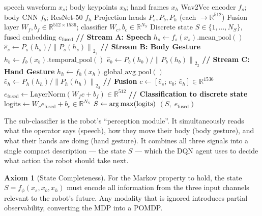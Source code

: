 \documentclass[12pt,a4paper]{article}
\theoremstyle{definition}
\newtheorem{axiom}{Axiom}[section]
\theoremstyle{plain}
\theoremstyle{remark}
\newcommand{\R}{\mathbb{R}}
\newcommand{\Norm}[1]{\left\|#1\right\|_2}
\newcommand{\LN}{\mathrm{LayerNorm}}
\newcommand{\argmax}{\operatornamewithlimits{arg\,max}}
\begin{document}
\begin{algorithm}[H]
\caption{Sub-Classifier Forward Pass: Multimodal State Encoding}
\label{alg:subclassifier}
\begin{algorithmic}[1]
\Require speech waveform $x_s$; body keypoints $x_b$; hand frames $x_h$
\Require Wav2Vec encoder $f_s$; body CNN $f_b$; ResNet-50 $f_h$
\Require Projection heads $P_s, P_b, P_h$ (each $\to \R^{512}$)
\Require Fusion layer $W_f, b_f \in \R^{512 \times 1536}$; classifier $W_c, b_c \in \R^{N_S}$
\Ensure Discrete state $S \in \{1,\ldots,N_S\}$, fused embedding $e_{\text{fused}}$
\State \textbf{// Stream A: Speech}
\State $h_s \gets f_s(x_s).\text{mean\_pool}()$ 
\State $\hat{e}_s \gets P_s(h_s) / \Norm{P_s(h_s)}_2$ 
\State \textbf{// Stream B: Body Gesture}
\State $h_b \gets f_b(x_b).\text{temporal\_pool}()$ 
\State $\hat{e}_b \gets P_b(h_b) / \Norm{P_b(h_b)}_2$ \Comment{$[512]$}
\State \textbf{// Stream C: Hand Gesture}
\State $h_h \gets f_h(x_h).\text{global\_avg\_pool}()$ 
\State $\hat{e}_h \gets P_h(h_h) / \Norm{P_h(h_h)}_2$ \Comment{$[512]$}
\State \textbf{// Fusion}
\State $c \gets [\hat{e}_s;\, \hat{e}_b;\, \hat{e}_h] \in \R^{1536}$ 
\State $e_{\text{fused}} \gets \LN(W_f c + b_f) \in \R^{512}$
\State \textbf{// Classification to discrete state}
\State $\text{logits} \gets W_c e_{\text{fused}} + b_c \in \R^{N_S}$
\State $S \gets \argmax(\text{logits})$
\State \Return $(S,\; e_{\text{fused}})$
\end{algorithmic}
\end{algorithm}

\begin{tcolorbox}[laymanbox]
The sub-classifier is the robot's ``perception module''. It simultaneously reads what the operator says (speech), how they move their body (body gesture), and what their hands are doing (hand gesture). It combines all three signals into a single compact description — the state $S$ — which the DQN agent uses to decide what action the robot should take next.
\end{tcolorbox}

\begin{axiom}[State Completeness]
For the Markov property to hold, the state $S = f_\phi(x_s, x_b, x_h)$ must encode all information from the three input channels relevant to the robot's future. Any modality that is ignored introduces partial observability, converting the MDP into a POMDP.
\end{axiom}
\end{document}
